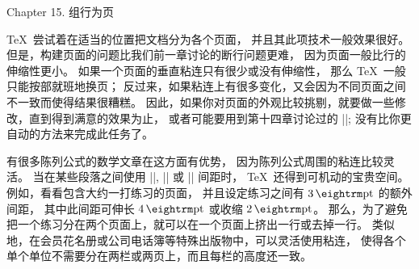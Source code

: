 


\beginchapter Chapter 15. 组行为页


\1\TeX\ 尝试着在适当的位置把文档分为各个页面，
并且其此项技术一般效果很好。%
但是，构建页面的问题比我们前一章讨论的断行问题更难，
因为页面一般比行的伸缩性更小。%
如果一个页面的垂直粘连只有很少或没有伸缩性，
那么 \TeX\ 一般只能按部就班地换页；
反过来，如果粘连上有很多变化，又会因为不同页面之间不一致而使得结果很糟糕。%
因此，如果你对页面的外观比较挑剔，就要做一些修改，直到得到满意的效果为止，
或者可能要用到第十四章讨论过的 |\looseness|;
没有比你更自动的方法来完成此任务了。

有很多陈列公式的数学文章在这方面有优势，
因为陈列公式周围的粘连比较灵活。%
当在某些段落之间使用 |\smallskip|, |\medskip| 或 |\bigskip| 间距时，
 \TeX\ 还得到可机动的宝贵空间。%
例如，看看包含大约一打练习的页面，
并且设定练习之间有 $3\pt$ 的额外间距，
其中此间距可伸长 $4\pt$ 或收缩 $2\pt$。%
那么，为了避免把一个练习分在两个页面上，就可以在一个页面上挤出一行或去掉一行。%
类似地，在会员花名册或公司电话簿等特殊出版物中，可以灵活使用粘连，
使得各个单个单位不需要分在两栏或两页上，而且每栏的高度还一致。


